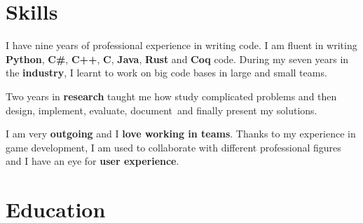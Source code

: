 \documentclass[letterpaper]{twentysecondcv} %
\begin{document}

\makeprofile %


\section{Skills}

I have nine years of professional experience in writing code. I am fluent in writing \textbf{Python}, \textbf{C\#}, \textbf{C++}, \textbf{C}, \textbf{Java}, \textbf{Rust} and \textbf{Coq} code. During my seven years in the \textbf{industry}, I learnt to work on big code bases in large and small teams.

Two years in \textbf{research} taught me how study complicated problems and then design, implement, evaluate, document and finally present my solutions.

I am very \textbf{outgoing} and I \textbf{love working in teams}. Thanks to my experience in game development, I am used to collaborate with different professional figures and I have an eye for \textbf{user experience}.\\





\section{Education}

\begin{twenty} %
\end{twenty}
\end{document}
